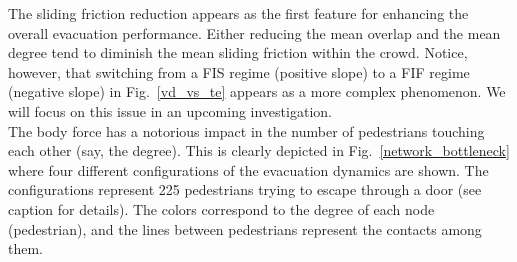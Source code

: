 \documentclass[preprint,12pt]{elsarticle}
\begin{document}
The sliding friction reduction appears as the first feature for enhancing
the overall evacuation performance. Either reducing the mean overlap and the mean degree
tend to diminish the mean sliding 
friction within the crowd. 
Notice, however, that switching from a FIS regime (positive slope) to a  FIF 
regime (negative slope) in Fig.~\ref{vd_vs_te} appears as a more complex 
phenomenon. We will focus on this issue in an upcoming investigation.\\

The body force 
has a notorious impact in the number of pedestrians touching each other (say, 
the degree). This is clearly depicted in Fig.~\ref{network_bottleneck} where 
four different configurations of the evacuation dynamics are shown. The 
configurations represent 225 pedestrians trying to escape through a door (see 
caption for details). The colors correspond to the degree of each node 
(pedestrian), and the lines between pedestrians represent the contacts among 
them.\\
\end{document}
